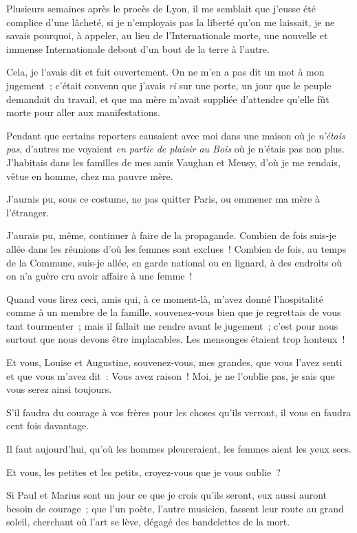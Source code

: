 \documentclass[french,twoside]{book} %
\begin{document}
Plusieurs semaines après le procès de Lyon, il me semblait que j’eusse été complice d’une lâcheté, si je n’employais pas la liberté qu’on me laissait, je ne savais pourquoi, à appeler, au lieu de l’Internationale morte, une nouvelle et immense Internationale debout d’un bout de la terre à l’autre.\par
Cela, je l’avais dit et fait ouvertement. On ne m’en a pas dit un mot à mon jugement ; c’était convenu que j’avais \emph{ri} sur une porte, un jour que le peuple demandait du travail, et que ma mère m’avait suppliée d’attendre qu’elle fût morte pour aller aux manifestations.\par
Pendant que certains reporters causaient avec moi dans une maison où je \emph{n’étais pas}, d’autres me voyaient \emph{en partie de plaisir au Bois} où je n’étais pas non plus. J’habitais dans les familles de mes amis Vaughan et Meusy, d’où je me rendais, vêtue en homme, chez ma pauvre mère.\par
 J’aurais pu, sous ce costume, ne pas quitter Paris, ou emmener ma mère à l’étranger.\par
J’aurais pu, même, continuer à faire de la propagande. Combien de fois suis-je allée dans les réunions d’où les femmes sont exclues ! Combien de fois, au temps de la Commune, suis-je allée, en garde national ou en lignard, à des endroits où on n’a guère cru avoir affaire à une femme !\par
Quand vous lirez ceci, amis qui, à ce moment-là, m’avez donné l’hospitalité comme à un membre de la famille, souvenez-vous bien que je regrettais de vous tant tourmenter ; mais il fallait me rendre avant le jugement ; c’est pour nous surtout que nous devons être implacables. Les mensonges étaient trop honteux !\par
Et vous, Louise et Augustine, souvenez-vous, mes grandes, que vous l’avez senti et que vous m’avez dit : Vous avez raison ! Moi, je ne l’oublie pas, je sais que vous serez ainsi toujours.\par
S’il faudra du courage à vos frères pour les choses qu’ils verront, il vous en faudra cent fois davantage.\par
Il faut aujourd’hui, qu’où les hommes pleureraient, les femmes aient les yeux secs.\par
Et vous, les petites et les petits, croyez-vous que je vous oublie ?\par
Si Paul et Marius sont un jour ce que je crois  qu’ils seront, eux aussi auront besoin de courage ; que l’un poète, l’autre musicien, fassent leur route au grand soleil, cherchant où l’art se lève, dégagé des bandelettes de la mort.\par
\end{document}
